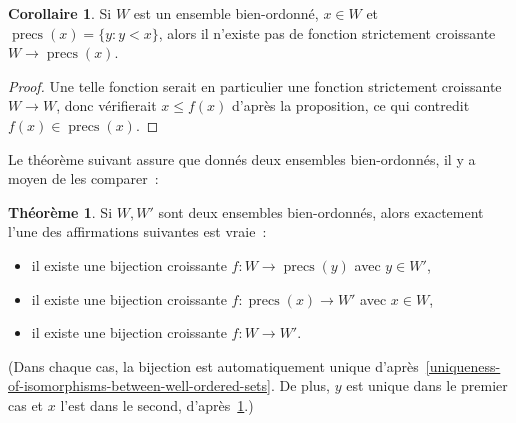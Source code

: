 \documentclass[12pt,a4paper]{article}
\theoremstyle{definition}
\newtheorem{thm}[comcnt]{Théorème}
\newtheorem{cor}[comcnt]{Corollaire}
\newcommand{\precs}{\operatorname{precs}}
\begin{document}
\begin{cor}\label{uniqueness-of-initial-segment-isomorphic-to-a-well-ordered-set}
Si $W$ est un ensemble bien-ordonné, $x\in W$ et $\precs(x) = \{y :
y<x\}$, alors il n'existe pas de fonction strictement croissante $W
\to \precs(x)$.
\end{cor}
\begin{proof}
Une telle fonction serait en particulier une fonction strictement
croissante $W \to W$, donc vérifierait $x \leq f(x)$ d'après la
proposition, ce qui contredit $f(x) \in \precs(x)$.
\end{proof}

Le théorème suivant assure que donnés deux ensembles bien-ordonnés, il
y a moyen de les comparer :
\begin{thm}\label{comparison-of-well-ordered-sets}
Si $W,W'$ sont deux ensembles bien-ordonnés, alors exactement l'une
des affirmations suivantes est vraie :
\begin{itemize}
\item il existe une bijection croissante $f\colon W \to \precs(y)$
  avec $y\in W'$,
\item il existe une bijection croissante $f\colon \precs(x) \to W'$
  avec $x\in W$,
\item il existe une bijection croissante $f\colon W \to W'$.
\end{itemize}
(Dans chaque cas, la bijection est automatiquement unique
d'après \ref{uniqueness-of-isomorphisms-between-well-ordered-sets}.
De plus, $y$ est unique dans le premier cas et $x$ l'est dans le
second,
d'après \ref{uniqueness-of-initial-segment-isomorphic-to-a-well-ordered-set}.)
\end{thm}
\end{document}
